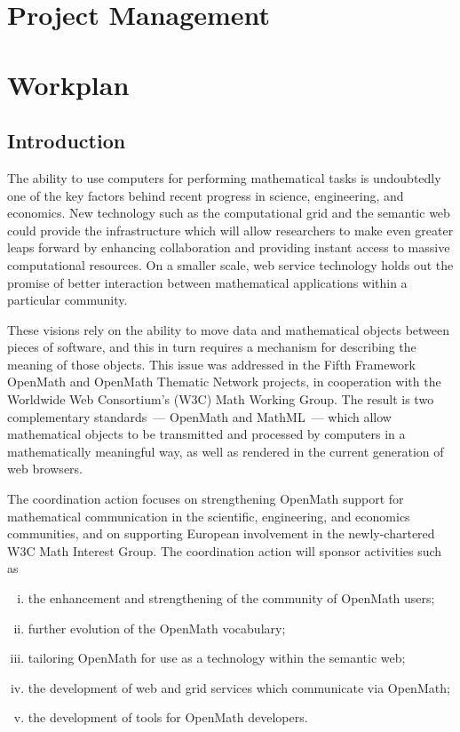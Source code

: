 \documentclass{euproposal}
\begin{document}
\chapter{Project Management}
\label{cha:management}


\chapter{Workplan}
\label{cha:workplan}



\section{Introduction}

The ability to use computers for performing mathematical tasks is
undoubtedly one of the key factors behind recent progress in science,
engineering, and economics.  New technology such as the computational
grid and the semantic web could provide the infrastructure which will
allow researchers to make even greater leaps forward by enhancing
collaboration and providing instant access to massive computational
resources.  On a smaller scale, web service technology holds out the
promise of better interaction between mathematical applications within
a particular community.

These visions rely on the ability to move data and mathematical
objects between pieces of software, and this in turn requires a
mechanism for describing the meaning of those objects.  This issue was
addressed in the Fifth Framework OpenMath and OpenMath Thematic
Network projects, in cooperation with the Worldwide Web Consortium's
(W3C) Math Working Group.  The result is two complementary
standards~--- OpenMath and MathML~--- which allow mathematical objects
to be transmitted and processed by computers in a mathematically
meaningful way, as well as rendered in the current generation of web
browsers.

The coordination action focuses on strengthening OpenMath support for
mathematical communication in the scientific, engineering, and
economics communities, and on supporting European involvement in the
newly-chartered W3C Math Interest Group.  The coordination action will
sponsor activities such as

\begin{enumerate}[(i)]
\item the enhancement and strengthening of the community of OpenMath
  users;
\item further evolution of the OpenMath vocabulary;
\item tailoring OpenMath for use as a technology within the semantic
  web;
\item the development of web and grid services which communicate via
  OpenMath;
\item the development of tools for OpenMath developers.
\end{enumerate}
\end{document}
